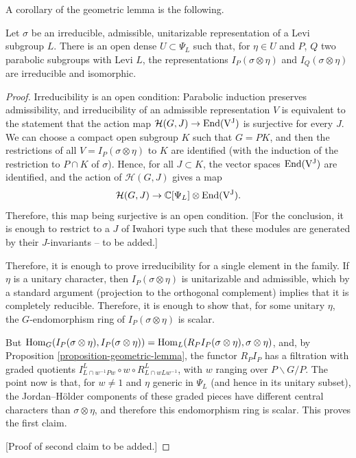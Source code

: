 A corollary of the geometric lemma is the following.

\begin{proposition}
	\label{proposition-irreducible-induction}
	Let $\sigma$ be an irreducible, admissible, unitarizable representation of a Levi subgroup $L$. There is an open dense $U\subset \Psi_L$ such that, for $\eta\in U$ and $P$, $Q$ two parabolic subgroups with Levi $L$, the representations $I_P(\sigma\otimes\eta)$ and $I_Q(\sigma\otimes\eta)$ are irreducible and isomorphic.
\end{proposition}

\begin{proof}
Irreducibility is an open condition: Parabolic induction preserves admissibility, and irreducibility of an admissible representation $V$ is equivalent to the statement that the action map $\mathcal H(G,J)\to \rm{End}(V^J)$ is surjective for every $J$. We can choose a compact open subgroup $K$ such that $G=PK$, and then the restrictions of all $V=I_P(\sigma\otimes\eta)$ to $K$ are identified (with the induction of the restriction to $P\cap K$ of $\sigma$). Hence, for all $J\subset K$, the vector spaces $\rm{End}(V^J)$ are identified, and the action of $\mathcal H(G,J)$ gives a map 
$$ \mathcal H(G,J) \to \mathbb C[\Psi_L]\otimes \rm{End}(V^J).$$
Therefore, this map being surjective is an open condition. [For the conclusion, it is enough to restrict to a $J$ of Iwahori type such that these modules are generated by their $J$-invariants -- to be added.]

Therefore, it is enough to prove irreducibility for a single element in the family. If $\eta$ is a unitary character, then $I_P(\sigma\otimes\eta)$ is unitarizable and admissible, which by a standard argument (projection to the orthogonal complement) implies that it is completely reducible. Therefore, it is enough to show that, for some unitary $\eta$, the $G$-endomorphism ring of $I_P(\sigma\otimes\eta)$ is scalar. 

But $\mathop{\rm Hom}\nolimits_G(I_P(\sigma\otimes\eta), I_P(\sigma\otimes\eta))= \mathop{\rm Hom}\nolimits_L(R_P I_P(\sigma\otimes\eta), \sigma\otimes\eta)$, and, by Proposition \ref{proposition-geometric-lemma}, the functor $R_P I_P$ has a filtration with graded quotients $I^L_{L\cap w^{-1}Pw} \circ w \circ R^L_{L\cap wLw^{-1}}$, with $w$ ranging over $P\backslash G/P$. The point now is that, for $w\ne 1$ and $\eta$ generic in $\Psi_L$ (and hence in its unitary subset), the Jordan--H\"older components of these graded pieces have different central characters than $\sigma\otimes\eta$, and therefore this endomorphism ring is scalar. This proves the first claim. 

[Proof of second claim to be added.]
 
\end{proof}



